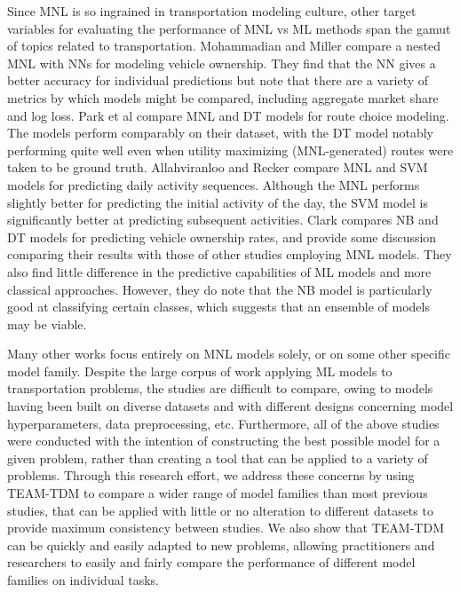 \documentclass[numbered]{trbunofficial}
\begin{document}
Since MNL is so ingrained in transportation modeling culture, other target variables for evaluating the performance of MNL vs ML methods span the gamut of topics related to transportation.
 Mohammadian and Miller  compare a nested MNL with NNs for modeling vehicle ownership.
 They find that the NN gives a better accuracy for individual predictions but note that there are a variety of metrics by which models might be compared, including aggregate market share and log loss.
 Park et al  compare MNL and DT models for route choice modeling.
 The models perform comparably on their dataset, with the DT model notably performing quite well even when utility maximizing (MNL-generated) routes were taken to be ground truth.
 Allahviranloo and Recker  compare MNL and SVM models for predicting daily activity sequences.
 Although the MNL performs slightly better for predicting the initial activity of the day, the SVM model is significantly better at predicting subsequent activities.
 Clark  compares NB and DT models for predicting vehicle ownership rates, and provide some discussion comparing their results with those of other studies employing MNL models.
 They also find little difference in the predictive capabilities of ML models and more classical approaches.
 However, they do note that the NB model is particularly good at classifying certain classes, which suggests that an ensemble of models may be viable.

Many other works focus entirely on MNL models solely, or on some other specific model family.
 Despite the large corpus of work applying ML models to transportation problems, the studies are difficult to compare, owing to models having been built on diverse datasets and with different designs concerning model hyperparameters, data preprocessing, etc.
 Furthermore, all of the above studies were conducted with the intention of constructing the best possible model for a given problem, rather than creating a tool that can be applied to a variety of problems.
 Through this research effort, we address these concerns by using TEAM-TDM to compare a wider range of model families than most previous studies, that can be applied with little or no alteration to different datasets to provide maximum consistency between studies.
 We also show that TEAM-TDM can be quickly and easily adapted to new problems, allowing practitioners and researchers to easily and fairly compare the performance of different model families on individual tasks.
\end{document}
